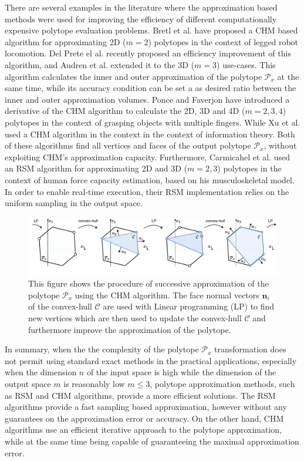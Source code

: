 There are several examples in the literature where the approximation based methods were used for improving the efficiency of different computationally expensive polytope evaluation problems. Bretl et al. \cite{Bretl2008} have proposed a CHM based algorithm for approximating 2D ($m\!=\!2$) polytopes in the context of legged robot locomotion. Del Prete el al. \cite{DelPrete2016Fast} recently proposed an efficiency improvement of this algorithm, and Audren et al. \cite{Herve2018} extended it to the 3D ($m\!=\!3$) use-cases. This algorithm calculates the inner and outer approximation of the polytope $\mathcal{P}_x$ at the same time, while its accuracy condition can be set a as desired ratio between the inner and outer approximation volumes. Ponce and Faverjon \cite{Ponce1995} have introduced a derivative of the CHM algorithm to calculate the 2D, 3D and 4D ($m\!=\!2,3,4$) polytopes in the context of grasping objects with multiple fingers. While Xu et al. \cite{Xu2008projection} used a CHM algorithm in the context in the context of information theory. Both of these algorithms find all vertices and faces of the output polytope $\mathcal{P}_x$, without exploiting CHM's approximation capacity. Furthermore, Carmicahel et al. \cite{carmichael_estimating_2013,carmichael2011Towards} used an RSM algorithm for approximating 2D and 3D ($m\! =\! 2,3$) polytopes in the context of human force capacity estimation, based on his musculoskeletal model. In order to enable real-time execution, their RSM implementation relies on the uniform sampling in the output space.

 
\begin{figure}
    \centering
    \includegraphics[width=\linewidth]{Papers/images/chm_algo.pdf}
    \caption{This figure shows the procedure of successive approximation of the polytope $\mathcal{P}_x$ using the CHM algorithm. The face normal vectors $\bm{n}_i$ of the convex-hull $\mathcal{C}$ are used with Linear programming (LP) to find new vertices which are then used to update the convex-hull $\mathcal{C}$ and furthermore improve the approximation of the polytope.}
    \label{fig:chm}
\end{figure}

In summary, when the the complexity of the polytope $\mathcal{P}_x$ transformation does not permit using standard exact methods in the practical applications, especially when the dimension $n$ of the input space is high while the dimension of the output space $m$ is reasonably low $m\leq3$, polytope approximation methods, such as RSM and CHM algorithms, provide a more efficient solutions. The RSM algorithms provide a fast sampling based approximation, however without any guarantees on the approximation error or accuracy. On the other hand, CHM algorithms use an efficient iterative approach to the polytope approximation, while at the same time being capable of guaranteeing the maximal approximation error.

